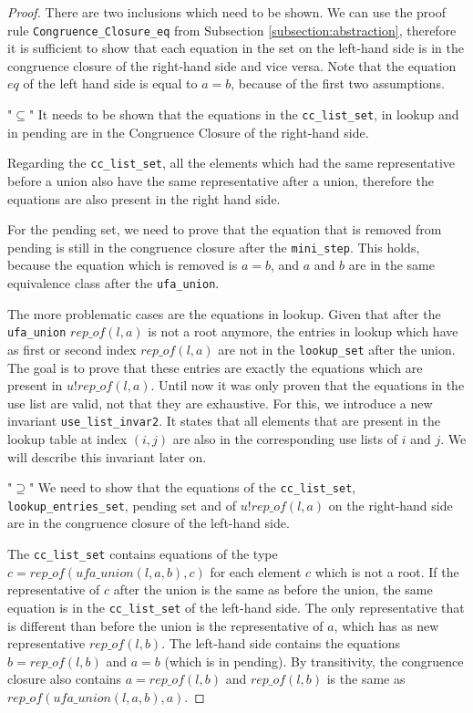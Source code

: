 \begin{proof}
There are two inclusions which need to be shown. We can use the proof rule \lstinline{Congruence_Closure_eq} from Subsection \ref{subsection:abstraction}, therefore it is sufficient to show that each equation in the set on the left-hand side is in the congruence closure of the right-hand side and vice versa. Note that the equation $eq$ of the left hand side is equal to $a = b$, because of the first two assumptions.

"$\subseteq$" It needs to be shown that the equations in the \lstinline{cc_list_set}, in lookup and in pending are in the Congruence Closure of the right-hand side.

Regarding the \lstinline{cc_list_set}, all the elements which had the same representative before a union also have the same representative after a union, therefore the equations are also present in the right hand side.

For the pending set, we need to prove that the equation that is removed from pending is still in the congruence closure after the \lstinline{mini_step}. This holds, because the equation which is removed is $a = b$, and $a$ and $b$ are in the same equivalence class after the \lstinline{ufa_union}.

The more problematic cases are the equations in lookup. Given that after the \lstinline{ufa_union} $rep\_of(l, a)$ is not a root anymore, the entries in lookup which have as first or second index $rep\_of(l, a)$ are not in the \lstinline{lookup_set} after the union.
The goal is to prove that these entries are exactly the equations which are present in $u ! rep\_of(l, a)$. Until now it was only proven that the equations in the use list are valid, not that they are exhaustive.
For this, we introduce a new invariant \lstinline{use_list_invar2}.
It states that all elements that are present in the lookup table at index $(i, j)$ are also in the corresponding use lists of $i$ and $j$. We will describe this invariant later on.

"$\supseteq$" We need to show that the equations of the \lstinline{cc_list_set}, \lstinline{lookup_entries_set}, pending set and of $u ! rep\_of(l, a)$ on the right-hand side are in the congruence closure of the left-hand side.

The \lstinline{cc_list_set} contains equations of the type $c = rep\_of (ufa\_union(l, a, b), c)$ for each element $c$ which is not a root.
If the representative of $c$ after the union is the same as before the union, the same equation is in the \lstinline{cc_list_set} of the left-hand side.
The only representative that is different than before the union is the representative of $a$, which has as new representative $rep\_of(l, b)$.
The left-hand side contains the equations $b = rep\_of(l, b)$ and $a = b$ (which is in pending).
By transitivity, the congruence closure also contains $a = rep\_of(l, b)$ and $rep\_of(l, b)$ is the same as $rep\_of (ufa\_union(l, a, b), a)$.


\end{proof}
